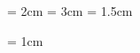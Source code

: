 

\usepackage{times}        %
\fontsize{12}{15}         %



\topmargin = 2cm          %
\oddsidemargin = 3cm      %
\evensidemargin = 1.5cm   %

\linespread{1.3}

\parindent = 1cm



